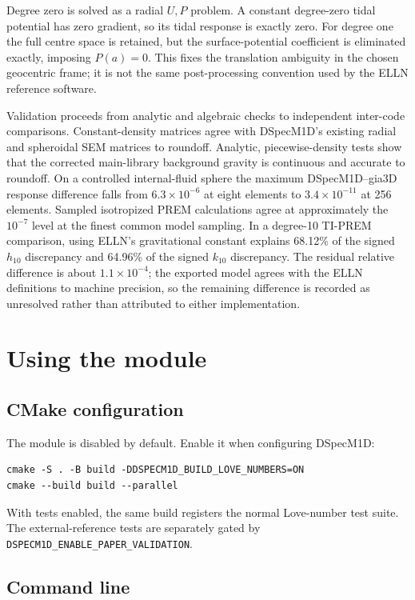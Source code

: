\documentclass[11pt,a4paper]{article}
\newcommand{\code}[1]{\texttt{#1}}
\begin{document}
Degree zero is solved as a radial \(U,P\) problem.  A constant degree-zero
tidal potential has zero gradient, so its tidal response is exactly zero.
For degree one the full centre space is retained, but the surface-potential
coefficient is eliminated exactly, imposing \(P(a)=0\).  This fixes the
translation ambiguity in the chosen geocentric frame; it is not the same
post-processing convention used by the ELLN reference software.

Validation proceeds from analytic and algebraic checks to independent
inter-code comparisons.  Constant-density matrices agree with DSpecM1D's
existing radial and spheroidal SEM matrices to roundoff.  Analytic,
piecewise-density tests show that the corrected main-library background
gravity is continuous and accurate to roundoff.  On a controlled internal-fluid
sphere the maximum DSpecM1D--gia3D response difference falls from
\(6.3\times10^{-6}\) at eight elements to \(3.4\times10^{-11}\) at 256
elements.  Sampled isotropized PREM calculations agree at approximately the
\(10^{-7}\) level at the finest common model sampling.  In a degree-10
TI-PREM comparison, using ELLN's gravitational constant explains 68.12\% of
the signed \(h_{10}\) discrepancy and 64.96\% of the signed \(k_{10}\)
discrepancy.  The residual relative difference is about \(1.1\times10^{-4}\);
the exported model agrees with the ELLN definitions to machine precision, so
the remaining difference is recorded as unresolved rather than attributed to
either implementation.

\section{Using the module}

\subsection{CMake configuration}

The module is disabled by default.  Enable it when configuring DSpecM1D:
\begin{verbatim}
cmake -S . -B build -DDSPECM1D_BUILD_LOVE_NUMBERS=ON
cmake --build build --parallel
\end{verbatim}
With tests enabled, the same build registers the normal Love-number test
suite.  The external-reference tests are separately gated by
\code{DSPECM1D\_ENABLE\_PAPER\_VALIDATION}.

\subsection{Command line}
\end{document}
